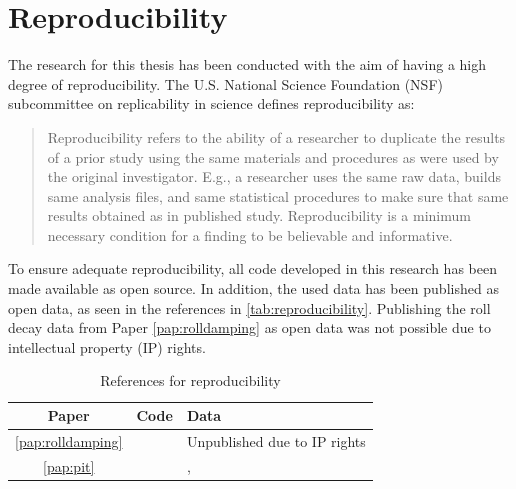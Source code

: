 \section{Reproducibility}
The research for this thesis has been conducted with the aim of having a high degree of reproducibility. The U.S. National Science Foundation (NSF) subcommittee on replicability in science defines reproducibility as:
\begin{quote}
Reproducibility refers to the ability of a researcher to duplicate the results of a prior study
using the same materials and procedures as were used by the original
investigator. 
E.g., a researcher uses the same raw data, builds same analysis files,
and same statistical procedures to make sure that same results
obtained as in published study. Reproducibility is a minimum necessary condition for a finding to be
believable and informative. 
    \cite{bollen_reproducibility_2015}
\end{quote}

\noindent To ensure adequate reproducibility, all code developed in this research has been made available as open source. In addition, the used data has been published as open data, as seen in the references in \autoref{tab:reproducibility}. Publishing the roll decay data from Paper \ref{pap:rolldamping} as open data was not possible due to intellectual property (IP) rights.

\begin{table}[H]
    \centering
    \caption{References for reproducibility}
    \label{tab:reproducibility}
    \begin{tabular}{|c|l|l|}
        \hline
         Paper &  Code & Data \\
         \hline
         \ref{pap:rolldamping} & \textcite{alexandersson_martinlarsalbertrolldecay-estimators_2020} & Unpublished due to IP rights\\
         \ref{pap:pit} & \textcite{alexandersson_code_2022} & \textcite{alexandersson_wpcc_2022}, \textcite{stern_experience_2011} \\
         \hline
    \end{tabular}
\end{table}

